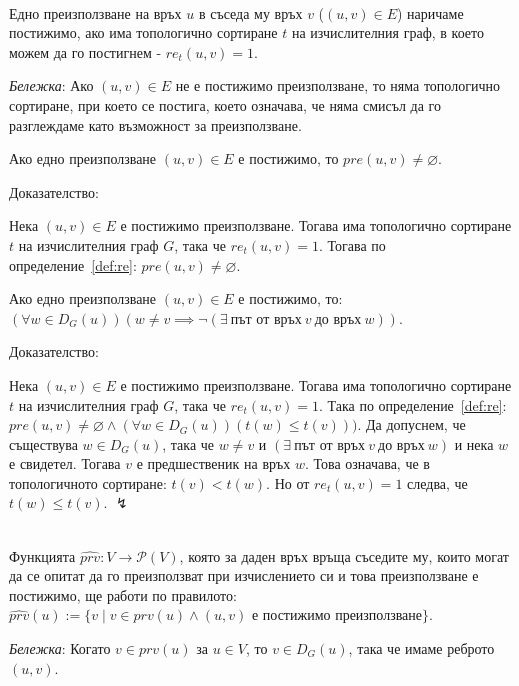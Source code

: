 \documentclass[12pt,twoside,a4paper]{article}
\begin{document}
	\begin{definition}\label{def:achievable-reuse}~\\
		\indent Едно преизползване на връх $u$ в съседа му връх $v$ ($(u,v) \in E$) наричаме постижимо, ако има топологично сортиране $t$ на изчислителния граф, в което можем да го постигнем - $re_t(u,v) = 1$.
		
		\textit{Бележка}: Ако $(u,v) \in E$ не е постижимо преизползване, то няма топологично сортиране, при което се постига, което означава, че няма смисъл да го разглеждаме като възможност за преизползване.
	\end{definition}
	
	\begin{corollary}\label{cor:achievable-reuse-pre} Ако едно преизползване $(u,v) \in E$ е постижимо, то $pre(u,v) \neq \varnothing$.
		
		\noindent Доказателство:
		
		Нека $(u,v) \in E$ е постижимо преизползване. Тогава има топологично сортиране $t$ на изчислителния граф $G$, така че $re_t(u,v) = 1$. Тогава по определение~\ref{def:re}: $pre(u,v) \neq \varnothing$.
	\end{corollary}
	
	\begin{corollary}\label{cor:achievable-reuse} Ако едно преизползване $(u,v) \in E$ е постижимо, то: $(\forall w \in D_G(u))(w \neq v \implies \lnot(\exists \ \text{път от връх} \ v \ \text{до връх} \ w))$.
		
		\noindent Доказателство:
		
		Нека $(u,v) \in E$ е постижимо преизползване. Тогава има топологично сортиране $t$ на изчислителния граф $G$, така че $re_t(u,v) = 1$. Така по определение~\ref{def:re}: $pre(u,v) \neq \varnothing \land (\forall w \in D_G(u))(t(w) \leq t(v)))$. Да допуснем, че съществува $w \in D_G(u)$, така че $w \neq v$ и $(\exists \ \text{път от връх} \ v \ \text{до връх} \ w)$ и нека $w$ е свидетел. Тогава $v$ е предшественик на връх $w$. Това означава, че в топологичното сортиране: $t(v) < t(w)$. Но от $re_t(u,v) = 1$ следва, че $t(w) \leq t(v)$. $\lightning$
	\end{corollary}
	
	\begin{definition}\label{def:hat-prv}~\\
		\indent Функцията $\hat{prv} \colon V \to \mathcal{P}(V)$, която за даден връх връща съседите му, които могат да се опитат да го преизползват при изчислението си и това преизползване е постижимо, ще работи по правилото: $\hat{prv}(u):=\{v \mid v \in prv(u) \land (u,v)\text{ е постижимо преизползване}\}$.
		
		\textit{Бележка}: Когато $v \in prv(u)$ за $u \in V$, то $v \in D_G(u)$, така че имаме реброто $(u,v)$.
	\end{definition}
	
\end{document}
